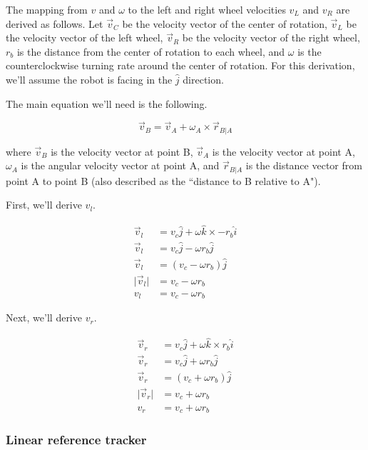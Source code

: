 The mapping from $v$ and $\omega$ to the left and right wheel velocities $v_L$
and $v_R$ are derived as follows. Let $\vec{v}_C$ be the velocity vector of the
center of rotation, $\vec{v}_L$ be the velocity vector of the left wheel,
$\vec{v}_R$ be the velocity vector of the right wheel, $r_b$ is the distance
from the center of rotation to each wheel, and $\omega$ is the counterclockwise
turning rate around the center of rotation. For this derivation, we'll assume
the robot is facing in the $\hat{j}$ direction.

The main equation we'll need is the following.

\begin{equation*}
  \vec{v}_B = \vec{v}_A + \omega_A \times \vec{r}_{B|A}
\end{equation*}

where $\vec{v}_B$ is the velocity vector at point B, $\vec{v}_A$ is the velocity
vector at point A, $\omega_A$ is the angular velocity vector at point A, and
$\vec{r}_{B|A}$ is the distance vector from point A to point B (also described
as the ``distance to B relative to A").

First, we'll derive $v_l$.

\begin{align}
  \vec{v}_l &= v_c \hat{j} + \omega \hat{k} \times -r_b \hat{i} \nonumber \\
  \vec{v}_l &= v_c \hat{j} - \omega r_b \hat{j} \nonumber \\
  \vec{v}_l &= (v_c - \omega r_b) \hat{j} \nonumber \\
  \lvert\vec{v}_l\rvert &= v_c - \omega r_b \nonumber \\
  v_l &= v_c - \omega r_b \label{eq:diff_vl}
\end{align}

Next, we'll derive $v_r$.

\begin{align}
  \vec{v}_r &= v_c \hat{j} + \omega \hat{k} \times r_b \hat{i} \nonumber
    \\
  \vec{v}_r &= v_c \hat{j} + \omega r_b \hat{j} \nonumber \\
  \vec{v}_r &= (v_c + \omega r_b) \hat{j} \nonumber \\
  \lvert\vec{v}_r\rvert &= v_c + \omega r_b \nonumber \\
  v_r &= v_c + \omega r_b \label{eq:diff_vr}
\end{align}

\subsubsection{Linear reference tracker}

